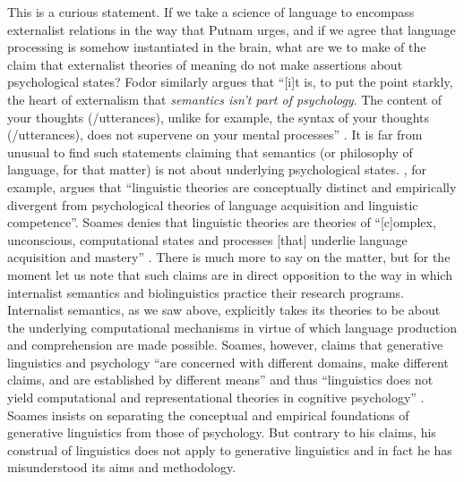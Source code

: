 This is a curious statement. If we take a science of language to encompass externalist relations in the way that Putnam urges, and if we agree that language processing is somehow instantiated in the brain, what are we to make of the claim that externalist theories of meaning do not make assertions about psychological states? Fodor similarly argues that “[i]t is, to put the point starkly, the heart of externalism that \textit{semantics isn’t part of psychology}. The content of your thoughts (/utterances), unlike for example, the syntax of your thoughts (/utterances), does not supervene on your mental processes” \citep[38, emphasis in original]{Fodor1994}. It is far from unusual to find such statements claiming that semantics (or philosophy of language, for that matter) is not about underlying psychological states. \citet{Soames1984}, for example, argues that “linguistic theories are conceptually distinct and empirically divergent from psychological theories of language acquisition and linguistic competence”. Soames denies that linguistic theories are theories of “[c]omplex, unconscious, computational states and processes [that] underlie language acquisition and mastery” \citep[155]{Soames1984}. There is much more to say on the matter, but for the moment let us note that such claims are in direct opposition to the way in which internalist semantics and biolinguistics practice their research programs. Internalist semantics, as we saw above, explicitly takes its theories to be about the underlying computational mechanisms in virtue of which language production and comprehension are made possible. Soames, however, claims that generative linguistics and psychology “are concerned with different domains, make different claims, and are established by different means” and thus “linguistics does not yield computational and representational theories in cognitive psychology” \citep[157]{Soames1984}. Soames insists on separating the conceptual and empirical foundations of generative linguistics from those of psychology. But contrary to his claims, his construal of linguistics does not apply to generative linguistics and in fact he has misunderstood its aims and methodology. 

